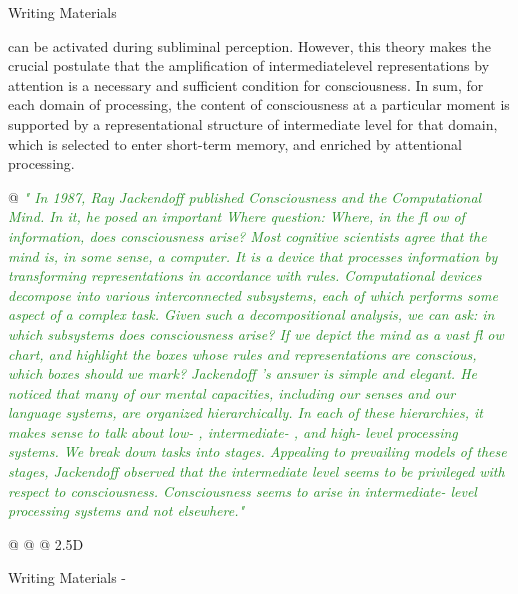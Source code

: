 \documentclass[utf8]{article}
\newenvironment{WritingMaterials} %
    	{
            \begin{tcolorbox}[enhanced,
                title=-,
                size=small,
                colbacktitle=Aquamarine,
                drop fuzzy shadow,
                fontupper=\small,
                boxrule=0.4pt,
                colback=Aquamarine!10!white,
                sharp corners]
                Writing Materials
            \end{tcolorbox}
            \begin{easylist}[itemize]
    	}
    	{
            \end{easylist}  
            \begin{tcolorbox}[enhanced,
                halign=flush right,
                halign title=right,
                size=small,
                colbacktitle=Aquamarine,
                drop fuzzy shadow,
                fontupper=\small,
                boxrule=0.4pt,
                colback=Aquamarine,
                colupper=White,
                sharp corners]
                Writing Materials -
            \end{tcolorbox}        
    	}
\newcommand{\rewrite}[1]{\textcolor{ForestGreen}{\textit{"#1"}}\newline}
\begin{document}
\begin{WritingMaterials}
{can be activated during subliminal perception. However, this theory makes the crucial postulate that the amplification of intermediatelevel representations by attention is a necessary and sufficient condition for consciousness. In sum, for each domain of processing, the content of consciousness at a particular moment is supported by a representational structure of intermediate level for that domain, which is selected to enter short-term memory, and enriched by attentional processing.} \cite{banks2009encyclopedia}

				@ \rewrite{
					In 1987, Ray Jackendoff published Consciousness and the Computational Mind. In it, he posed an important Where question: Where, in the fl ow of information, does consciousness arise? Most cognitive scientists agree that the mind is, in some sense, a computer. It is a device that processes information by transforming representations in accordance with rules. Computational devices decompose into various interconnected subsystems, each of which performs some aspect of a complex task. Given such a decompositional analysis, we can ask: in which subsystems does consciousness arise? If we depict the mind as a vast fl ow chart, and highlight the boxes whose rules and representations are conscious, which boxes should we mark? Jackendoff ’s answer is simple and elegant. He noticed that many of our mental capacities, including our senses and our language systems, are organized hierarchically. In each of these hierarchies, it makes sense to talk about low- , intermediate- , and high- level processing systems. We break down tasks into stages. Appealing to prevailing models of these stages, Jackendoff observed that the intermediate level seems to be privileged with respect to consciousness. Consciousness seems to arise in intermediate- level processing systems and not elsewhere.} \cite{prinz2007intermediate}

				@ \cite{jackendoff1987consciousness}
				@ \cite{prinz2007intermediate}
				@ 2.5D



\end{WritingMaterials}
\end{document}
